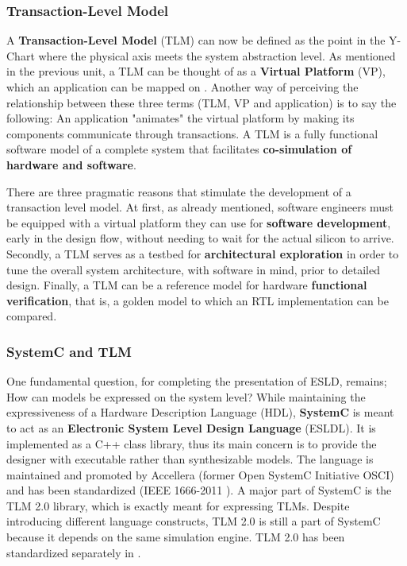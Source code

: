 \documentclass[11pt]{article}
\begin{document}
\subsubsection{Transaction-Level Model}
\label{sec:org6c8c941}
A \textbf{Transaction-Level Model} (TLM) can now be defined as the point in the Y-Chart where the physical axis meets the system abstraction level.
As mentioned in the previous unit, a TLM can be thought of as a \textbf{Virtual Platform} (VP), which an application can be mapped on \cite{Rigo2011}.
Another way of perceiving the relationship between these three terms (TLM, VP and application) is to say the following:
An application "animates" the virtual platform by making its components communicate through transactions.
A TLM is a fully functional software model of a complete system that facilitates \textbf{co-simulation of hardware and software}.

There are three pragmatic reasons that stimulate the development of a transaction level model.
At first, as already mentioned, software engineers must be equipped with a virtual platform they can use for \textbf{software development}, early in the design flow, without needing to wait for the actual silicon to arrive.
Secondly, a TLM serves as a testbed for \textbf{architectural exploration} in order to tune the overall system architecture, with software in mind, prior to detailed design.
Finally, a TLM can be a reference model for hardware \textbf{functional verification}, that is, a golden model to which an RTL implementation can be compared.

\subsubsection{SystemC and TLM}
\label{sec:org0f66e4d}
One fundamental question, for completing the presentation of ESLD, remains; How can models be expressed on the system level?
While maintaining the expressiveness of a Hardware Description Language (HDL), \textbf{SystemC} is meant to act as an \textbf{Electronic System Level Design Language} (ESLDL).
It is implemented as a C++ class library, thus its main concern is to provide the designer with executable rather than synthesizable models.
The language is maintained and promoted by Accellera (former Open SystemC Initiative OSCI) and has been standardized (IEEE 1666-2011 \cite{OpenSystemCInitiative2012}).
A major part of SystemC is the TLM 2.0 library, which is exactly meant for expressing TLMs.
Despite introducing different language constructs, TLM 2.0 is still a part of SystemC because it depends on the same simulation engine.
TLM 2.0 has been standardized separately in \cite{OpenSystemCInitiative2009}.
\clearpage
\end{document}
